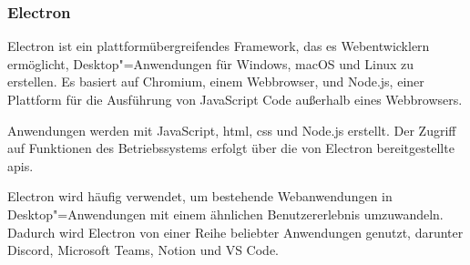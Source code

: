 \subsubsection{Electron}

Electron ist ein plattformübergreifendes Framework, das es Webentwicklern ermöglicht, Desktop"=Anwendungen für Windows, macOS und Linux zu erstellen.
Es basiert auf Chromium, einem Webbrowser, und Node.js, einer Plattform für die Ausführung von JavaScript Code außerhalb eines Webbrowsers.
\cite{electron:docs}

Anwendungen werden mit JavaScript, \ac{html}, \ac{css} und Node.js erstellt.
Der Zugriff auf Funktionen des Betriebssystems erfolgt über die von Electron bereitgestellte \acp{api}.
\cite{electron:docs}

Electron wird häufig verwendet, um bestehende Webanwendungen in Desktop"=Anwendungen mit einem ähnlichen Benutzererlebnis umzuwandeln.
Dadurch wird Electron von einer Reihe beliebter Anwendungen genutzt, darunter Discord, Microsoft Teams, Notion und VS Code.
\cite{electron}

